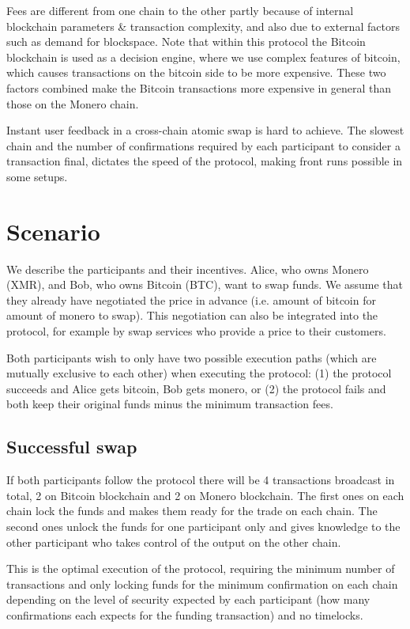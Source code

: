 \documentclass{llncs}
\begin{document}
Fees are different from one chain to the other partly because of internal blockchain parameters & transaction complexity, and also due to external factors such as demand for blockspace. Note that within this protocol the Bitcoin blockchain is used as a decision engine, where we use complex features of bitcoin, which causes transactions on the bitcoin side to be more expensive. These two factors combined make the Bitcoin transactions more expensive in general than those on the Monero chain.

Instant user feedback in a cross-chain atomic swap is hard to achieve.  The slowest chain and the number of confirmations required by each participant to consider a transaction final, dictates the speed of the protocol, making front runs possible in some setups.

\section{Scenario}
We describe the participants and their incentives. Alice, who owns Monero (XMR), and Bob, who owns Bitcoin (BTC), want to swap funds. We assume that they already have negotiated the price in advance (i.e. amount of bitcoin for amount of monero to swap). This negotiation can also be integrated into the protocol, for example by swap services who provide a price to their customers.

Both participants wish to only have two possible execution paths (which are mutually exclusive to each other) when executing the protocol: (1) the protocol succeeds and Alice gets bitcoin, Bob gets monero, or (2) the protocol fails and both keep their original funds minus the minimum transaction fees.

\subsection{Successful swap}
If both participants follow the protocol there will be 4 transactions broadcast in total, 2 on Bitcoin blockchain and 2 on Monero blockchain. The first ones on each chain lock the funds and makes them ready for the trade on each chain. The second ones unlock the funds for one participant only and gives knowledge to the other participant who takes control of the output on the other chain.

This is the optimal execution of the protocol, requiring the minimum number of transactions and only locking funds for the minimum confirmation on each chain depending on the level of security expected by each participant (how many confirmations each expects for the funding transaction) and no timelocks.
\end{document}
